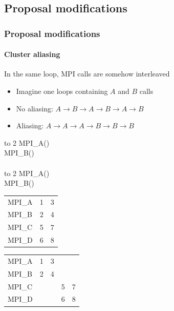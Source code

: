 \documentclass{beamer}
\begin{document}
\subsection{Proposal modifications}
\begin{frame}
\frametitle{Proposal modifications}
\framesubtitle{Cluster aliasing}
In the same loop, MPI calls are somehow interleaved
\begin{itemize}
	\item Imagine one loops containing $A$ and $B$ calls
	\item No aliasing: $A \rightarrow B \rightarrow A \rightarrow B \rightarrow A \rightarrow B$
	\item Aliasing: $A \rightarrow A \rightarrow A \rightarrow B \rightarrow B \rightarrow B$ 
\end{itemize}
\begin{multicols}{3}
	\begin{pseudocode}{ }{ }
		 to 2 \DO
		\BEGIN
			MPI\_A()\\
			MPI\_B()\\
		\END\\
		 to 2 \DO
		\BEGIN
			MPI\_A()\\
			MPI\_B()\\
		\END
	\end{pseudocode}
	\vfill \null
	\columnbreak
	\pause
	\null \vfill
	\begin{table}[]
		\centering
		\begin{tabular}{l|ll}
			MPI\_A & 1 & 3 \\
			MPI\_B & 2 & 4 \\
			MPI\_C & 5 & 7 \\
			MPI\_D & 6 & 8
		\end{tabular}
	\end{table}
	\vfill \null
	\columnbreak
	\pause
	\null \vfill
	\begin{table}[]
		\centering
		\begin{tabular}{l|llll}
			MPI\_A & 1 & 3 &   &   \\
			MPI\_B & 2 & 4 &   &   \\ \hline
			MPI\_C &   &   & 5 & 7 \\
			MPI\_D &   &   & 6 & 8
		\end{tabular}
	\end{table}
	\vfill \null
\end{multicols}
\end{frame}
\end{document}
